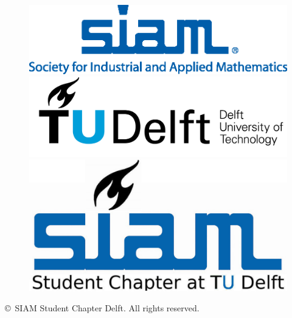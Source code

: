 \documentclass{article}
\begin{document}
\begin{figure}[h]
 \includegraphics[scale = 0.35]{Society_for_Industrial_and_Applied_Mathematics_(logo).png} \hfill
 \includegraphics[scale = 0.75]{TU_cropped} \hfill
 \includegraphics[scale = 0.65]{SIAMSC_Delft_cropped.png}
\end{figure}
\vspace{1cm}
\noindent \copyright \ SIAM Student Chapter Delft. All rights reserved.
\newpage
\end{document}
